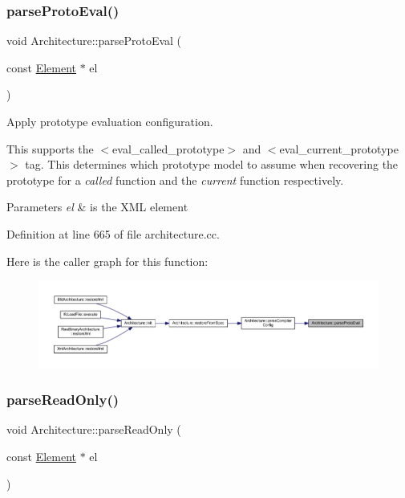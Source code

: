 \subsubsection{\texorpdfstring{parseProtoEval()}{parseProtoEval()}}
{\footnotesize\ttfamily void Architecture\+::parse\+Proto\+Eval (\begin{DoxyParamCaption}\item[{const \mbox{\hyperlink{class_element}{Element}} $\ast$}]{el }\end{DoxyParamCaption})\hspace{0.3cm}{\ttfamily [protected]}}



Apply prototype evaluation configuration. 

This supports the $<$eval\+\_\+called\+\_\+prototype$>$ and $<$eval\+\_\+current\+\_\+prototype$>$ tag. This determines which prototype model to assume when recovering the prototype for a {\itshape called} function and the {\itshape current} function respectively. 
\begin{DoxyParams}{Parameters}
{\em el} & is the X\+ML element \\
\hline
\end{DoxyParams}


Definition at line 665 of file architecture.\+cc.

Here is the caller graph for this function\+:
\nopagebreak
\begin{figure}[H]
\begin{center}
\leavevmode
\includegraphics[width=350pt]{class_architecture_a3e32daad5f4744f55c43f8acdd7ee8eb_icgraph}
\end{center}
\end{figure}
\mbox{\label{class_architecture_a85374e24548406ae6497021150aa5d2c}} 
\subsubsection{\texorpdfstring{parseReadOnly()}{parseReadOnly()}}
{\footnotesize\ttfamily void Architecture\+::parse\+Read\+Only (\begin{DoxyParamCaption}\item[{const \mbox{\hyperlink{class_element}{Element}} $\ast$}]{el }\end{DoxyParamCaption})\hspace{0.3cm}{\ttfamily [protected]}}



